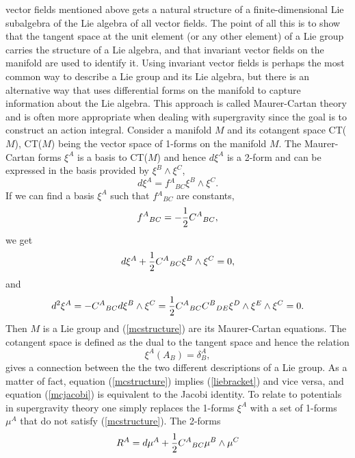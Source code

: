 vector fields mentioned above gets a natural structure of a finite-dimensional Lie subalgebra of the Lie algebra of all vector fields. The point of all this is to 
show that the tangent space at the unit element (or any other element) of a Lie group carries the structure of a Lie algebra, and that invariant vector fields 
on the manifold are used to identify it. \newline
Using invariant vector fields is perhaps the most common way to describe a Lie group and its Lie algebra, but there is an alternative way that uses differential forms 
on the manifold to capture information about the Lie algebra. This approach is called Maurer-Cartan theory and is often more appropriate 
when dealing with supergravity since the goal is to construct an action integral. Consider a manifold $M$ 
and its cotangent space CT($M$), CT($M$) being the vector space of 1-forms on the manifold $M$. The Maurer-Cartan forms $\xi^A$ 
is a basis to CT($M$) and hence $d\xi^A$ is a 2-form and can be expressed in the basis provided by $\xi^B \wedge \xi^C$,
\begin{equation}
d\xi^A=f{^A}_{BC}\xi^B \wedge \xi^C.
\end{equation}
If we can find a basis $\xi^A$ such that $f{^A}_{BC}$ are constants,
\begin{equation}
f{^A}_{BC}=-{1 \over 2}C{^A}_{BC},
\end{equation}
we get
\begin{equation}
d\xi^A+{1 \over 2}C{^A}_{BC}\xi^B \wedge \xi^C=0,
\label{mcstructure}
\end{equation}
and
\begin{equation}
d^2 \xi^A = -C{^A}_{BC}d\xi^B \wedge \xi^C = {1 \over 2}C{^A}_{BC}C{^B}_{DE}\xi^D \wedge \xi^E \wedge \xi^C = 0.
\label{mcjacobi}
\end{equation}
Then $M$ is a Lie group and (\ref{mcstructure}) are its Maurer-Cartan equations. The cotangent space is defined as the dual 
to the tangent space and hence the relation
\begin{equation}
\xi^A(A_B)=\delta^{A}_B,
\end{equation}
gives a connection between the the two different descriptions of a Lie group. As a matter of fact, equation (\ref{mcstructure}) 
implies (\ref{liebracket}) and vice versa, and equation (\ref{mcjacobi}) is equivalent to the Jacobi identity. To relate to potentials 
in supergravity theory one simply replaces the 1-forms $\xi^A$ with a set of 1-forms $\mu^A$ that do not satisfy (\ref{mcstructure}). The 2-forms
\begin{equation}
R^A = d\mu^A + {1 \over 2}C{^A}_{BC}\mu^B \wedge \mu^C
\label{mccurvature}
\end{equation}
